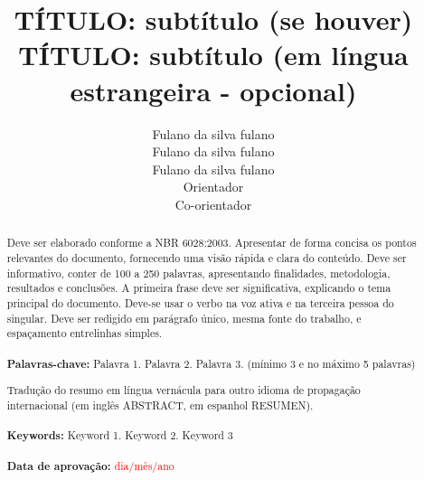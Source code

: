 \documentclass[12pt]{article}
\title{TÍTULO: subtítulo (se houver)\\ TÍTULO: subtítulo (em língua estrangeira - opcional)}
\author{
Fulano da silva fulano \footnotemark[1]  \\
Fulano da silva fulano \footnotemark[2]  \\
Fulano da silva fulano \footnotemark[3]  \\
Orientador \footnotemark[4] \\
Co-orientador \footnotemark[5]\\
}
\begin{document}
 

\maketitle


\begin{abstract} %
  \hspace{-1.5cm}Deve ser elaborado conforme a NBR 6028:2003. Apresentar de forma concisa os pontos relevantes do documento, fornecendo uma visão rápida e clara do conteúdo. Deve ser informativo, conter de 100 a 250 palavras, apresentando finalidades, metodologia, resultados e conclusões. A primeira frase deve ser significativa, explicando o tema principal do documento. Deve-se usar o verbo na voz ativa e na terceira pessoa do singular. Deve ser redigido em parágrafo único, mesma fonte do trabalho, e espaçamento entrelinhas simples. \\ \\ \textbf{Palavras-chave:} Palavra 1. Palavra 2. Palavra 3. (mínimo 3 e no máximo 5 palavras)
\end{abstract}

{
\vspace{0.5cm}
\begin{abstract}
  \hspace{-1.5cm}Tradução do resumo em língua vernácula para outro idioma de propagação internacional (em inglês ABSTRACT, em espanhol RESUMEN).\\ \\ \textbf{Keywords:} Keyword 1. Keyword 2. Keyword 3 \\ \\ \textbf{Data de aprovação:} \textcolor{red}{dia/mês/ano}
\end{abstract}
}
\end{document}
